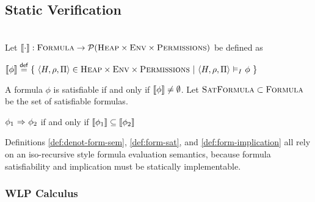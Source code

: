 \documentclass {llncs}
\begin{document}
\subsection{Static Verification} \label{sec:svlrp-staticv}

\begin{definition}\label{def:denot-form-sem}~\\
	Let $\envs{\cdot} : \setFormula \rightarrow \PP(\setHeap \times \setVarEnv \times \setDFootprintIso)$ be defined as
	
	$\envs{\phi} \defeq \{~ \langle H, \rho, \perm \rangle \in \setHeap \times \setVarEnv \times \setDFootprintIso ~|~ \evalphiGen{I}{\langle H, \rho, \perm \rangle}{\phi} ~\}$
\end{definition}
\begin{definition}\label{def:form-sat}
	A formula $\phi$ is satisfiable if and only if $\envs{\phi} \neq \emptyset$.
	Let $\setFormulaA \subset \setFormula$ be the set of satisfiable formulas.
\end{definition}
\begin{definition}\label{def:form-implication}
	$\phiImplies{\phi_1}{\phi_2}$ if and only if $\envs{\phi_1} \subseteq \envs{\phi_2}$
\end{definition}

Definitions \ref{def:denot-form-sem}, \ref{def:form-sat}, and \ref{def:form-implication} all rely on an iso-recursive style formula evaluation semantics, because formula satisfiability and implication must be statically implementable.

\subsubsection{WLP Calculus} \hspace{0.3cm}
\end{document}
